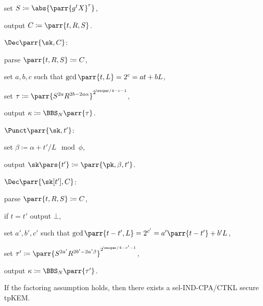 \begin{construction}
\begin{sitemize}
\begin{sitemize}
            \item set \(S \coloneqq \abs{\parr{g^t X}^r}\),
            \item output \(C \coloneqq \parr{t,R,S}\).
        \end{sitemize}
        \item \(\Dec\parr{\sk,C}\):
        \begin{sitemize}
            \item parse \(\parr{t,R,S} \coloneqq C\),
            \item set \(a,b,c\) such that \(\gcd\parr{t,L} = 2^c = a t + b L\),
            \item set \(\tau \coloneqq \parr{S^{2a} R^{2b-2a\alpha}}^{2^{\secpar/4-c-1}}\),
            \item output \(\kappa \coloneqq \BBS_N\parr{\tau}\).
        \end{sitemize}

        \item \(\Punct\parr{\sk,t'}\):
        \begin{sitemize}
            \item set \(\beta \coloneqq \alpha + t'/L \mod \phi\),
            \item output \(\sk\pars{t'} \coloneqq \parr{\pk,\beta,t'}\).
        \end{sitemize}
        \item \(\Dec\parr{\sk[t'],C}\):
        \begin{sitemize}
            \item parse \(\parr{t,R,S} \coloneqq C\),
            \item if \(t = t'\) output \(\bot\),
            \item set \(a',b',c'\) such that \(\gcd\parr{t-t',L} = 2^{c'} = a' \parr{t-t'} + b' L\),
            \item set \(\tau' \coloneqq \parr{S^{2a'} R^{2b'-2a'\beta}}^{2^{\secpar/4-c'-1}}\),
            \item output \(\kappa \coloneqq \BBS_N\parr{\tau'}\).
        \end{sitemize}
    \end{sitemize}
\end{construction}

\begin{theorem}[Informal]
    If the factoring assumption holds,
    then there exists a sel-IND-CPA/CTKL secure tpKEM.
\end{theorem}

